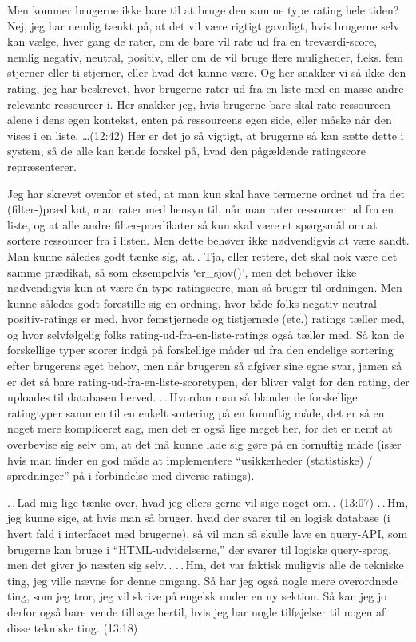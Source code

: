 \documentclass{report}
\begin{document}
Men kommer brugerne ikke bare til at bruge den samme type rating hele tiden? Nej, jeg har nemlig tænkt på, at det vil være rigtigt gavnligt, hvis brugerne selv kan vælge, hver gang de rater, om de bare vil rate ud fra en treværdi-score, nemlig negativ, neutral, positiv, eller om de vil bruge flere muligheder, f.eks. fem stjerner eller ti stjerner, eller hvad det kunne være. Og her snakker vi så ikke den rating, jeg har beskrevet, hvor brugerne rater ud fra en liste med en masse andre relevante ressourcer i. Her snakker jeg, hvis brugerne bare skal rate ressourcen alene i dens egen kontekst, enten på ressourcens egen side, eller måske når den vises i en liste. 
\ldots(12:42) Her er det jo så vigtigt, at brugerne så kan sætte dette i system, så de alle kan kende forskel på, hvad den pågældende ratingscore repræsenterer. 

Jeg har skrevet ovenfor et sted, at man kun skal have termerne ordnet ud fra det (filter-)prædikat, man rater med hensyn til, når man rater ressourcer ud fra en liste, og at alle andre filter-prædikater så kun skal være et spørgsmål om at sortere ressourcer fra i listen. Men dette behøver ikke nødvendigvis at være sandt. Man kunne således godt tænke sig, at.\,. Tja, eller rettere, det skal nok være det samme prædikat, så som eksempelvis `er\_sjov()', men det behøver ikke nødvendigvis kun at være én type ratingscore, man så bruger til ordningen. Men kunne således godt forestille sig en ordning, hvor både folks negativ-neutral-positiv-ratings er med, hvor femstjernede og tistjernede (etc.) ratings tæller med, og hvor selvfølgelig folks rating-ud-fra-en-liste-ratings også tæller med. Så kan de forskellige typer scorer indgå på forskellige måder ud fra den endelige sortering efter brugerens eget behov, men når brugeren så afgiver sine egne svar, jamen så er det så bare rating-ud-fra-en-liste-scoretypen, der bliver valgt for den rating, der uploades til databasen herved. .\,.\,Hvordan man så blander de forskellige ratingtyper sammen til en enkelt sortering på en fornuftig måde, det er så en noget mere kompliceret sag, men det er også lige meget her, for det er nemt at overbevise sig selv om, at det må kunne lade sig gøre på en fornuftig måde (især hvis man finder en god måde at implementere ``usikkerheder (statistiske) / spredninger'' på i forbindelse med diverse ratings). 

.\,.\,Lad mig lige tænke over, hvad jeg ellers gerne vil sige noget om.\,. (13:07) .\,.\,Hm, jeg kunne sige, at hvis man så bruger, hvad der svarer til en logisk database (i hvert fald i interfacet med brugerne), så vil man så skulle lave en query-API, som brugerne kan bruge i ``HTML-udvidelserne,'' der svarer til logiske query-sprog, men det giver jo næsten sig selv.\,. .\,.\,Hm, det var faktisk muligvis alle de tekniske ting, jeg ville nævne for denne omgang. Så har jeg også nogle mere overordnede ting, som jeg tror, jeg vil skrive på engelsk under en ny sektion. Så kan jeg jo derfor også bare vende tilbage hertil, hvis jeg har nogle tilføjelser til nogen af disse tekniske ting. (13:18)
\end{document}

